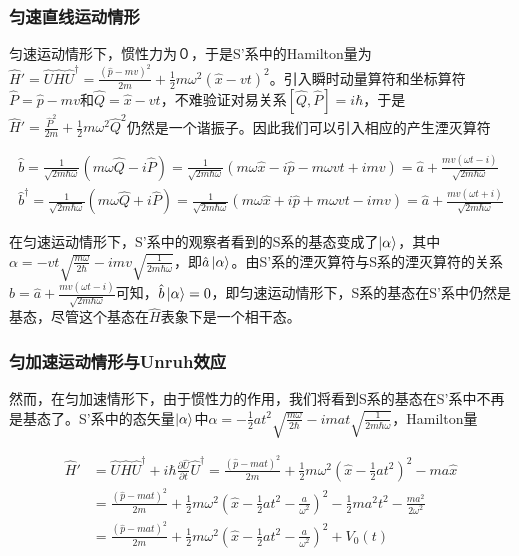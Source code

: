\documentclass[a4paper]{article}
\begin{document}
        \subsubsection{匀速直线运动情形}

            匀速运动情形下，惯性力为０，于是S'系中的Hamilton量为$\hat{H}'=\hat{U}\hat{H}\hat{U}^\dagger=\frac{(\hat{p}-mv)^2}{2m}+\frac{1}{2}m\omega^2(\hat{x}-vt)^2$。引入瞬时动量算符和坐标算符$\hat{P}=\hat{p}-mv$和$\hat{Q}=\hat{x}-vt$，不难验证对易关系$[\hat{Q},\hat{P}]=i\hbar$，于是$\hat{H}'=\frac{\hat{P}^2}{2m}+\frac{1}{2}m\omega^2\hat{Q}^2$仍然是一个谐振子。因此我们可以引入相应的产生湮灭算符

            \begin{equation}
                \begin{array}{lr}
                    \hat{b}=\frac{1}{\sqrt{2m\hbar\omega}}(m\omega\hat{Q}-i\hat{P})=\frac{1}{\sqrt{2m\hbar\omega}}(m\omega\hat{x}-i\hat{p}-m\omega vt+imv)=\hat{a}+\frac{mv(\omega t-i)}{\sqrt{2m\hbar\omega}} \\
                    \hat{b}^\dagger=\frac{1}{\sqrt{2m\hbar\omega}}(m\omega\hat{Q}+i\hat{P})=\frac{1}{\sqrt{2m\hbar\omega}}(m\omega\hat{x}+i\hat{p}+m\omega vt-imv)=\hat{a}+\frac{mv(\omega t+i)}{\sqrt{2m\hbar\omega}}
                \end{array}
            \end{equation}

            在匀速运动情形下，S'系中的观察者看到的S系的基态变成了$\ket{\alpha}$，其中$\alpha=-vt\sqrt{\frac{m\omega}{2\hbar}}-imv\sqrt{\frac{1}{2m\hbar\omega}}$，即$\hat{a}\ket{\alpha}$。由S'系的湮灭算符与S系的湮灭算符的关系$\hat{b}=\hat{a}+\frac{mv(\omega t-i)}{\sqrt{2m\hbar\omega}}$可知，$\hat{b}\ket{\alpha}=0$，即匀速运动情形下，S系的基态在S'系中仍然是基态，尽管这个基态在$\hat{H}$表象下是一个相干态。


        \subsubsection{匀加速运动情形与Unruh效应}

            然而，在匀加速情形下，由于惯性力的作用，我们将看到S系的基态在S'系中不再是基态了。S'系中的态矢量$\ket{\alpha}$中$\alpha=-\frac{1}{2}at^2\sqrt{\frac{m\omega}{2\hbar}}-imat\sqrt{\frac{1}{2m\hbar\omega}}$，Hamilton量
            
            \begin{equation}
                \begin{split}
                    \hat{H}' &= \hat{U}\hat{H}\hat{U}^\dagger+i\hbar\frac{\partial\hat{U}}{\partial t}\hat{U}^\dagger = \frac{(\hat{p}-mat)^2}{2m}+\frac{1}{2}m\omega^2(\hat{x}-\frac{1}{2}at^2)^2-ma\hat{x} \\
                        &= \frac{(\hat{p}-mat)^2}{2m}+\frac{1}{2}m\omega^2(\hat{x}-\frac{1}{2}at^2-\frac{a}{\omega^2})^2-\frac{1}{2}ma^2t^2-\frac{ma^2}{2\omega^2}　\\
                        &= \frac{(\hat{p}-mat)^2}{2m}+\frac{1}{2}m\omega^2(\hat{x}-\frac{1}{2}at^2-\frac{a}{\omega^2})^2+V_0(t)
                \end{split}
            \end{equation}
                
\end{document}
